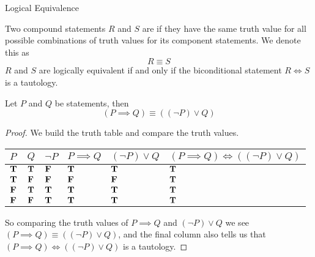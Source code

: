 \vspace*{2em}

\begin{mdframed}
\begin{center}
{\Large Logical Equivalence}
\end{center}
\end{mdframed}

\begin{definition}
Two compound statements $R$ and $S$ are  if they have the same truth value for all possible combinations of truth values for its component statements. We denote this as
\[R \equiv S\]
$R$ and $S$ are logically equivalent if and only if the biconditional statement $R \iff S$ is a tautology.  
\end{definition}

\vspace*{1em}

\begin{theorem}\label{theorem:impliesequiv}
Let $P$ and $Q$ be statements, then
\[(P \implies Q) \equiv ((\neg P) \vee Q)\]
\end{theorem}
\begin{proof}
We build the truth table and compare the truth values.
\begin{center}
{\renewcommand{\arraystretch}{1.5}%
\begin{tabular}{|>{\centering}m{1cm}|>{\centering}m{1cm}|>{\centering}m{1cm}||>{\centering}m{1.5cm}||>{\centering}m{2cm}||>{\centering\arraybackslash}m{4.25cm}|}
\hline
\rowcolor{lightgrey}
$P$ & $Q$ & $\neg P$ & $P \implies Q$ & $(\neg P) \vee Q$ & $(P \implies Q) \iff ((\neg P) \vee Q)$\\
\hline
$\mathbf{T}$ & $\mathbf{T}$ & $\mathbf{F}$ & $\mathbf{T}$ & $\mathbf{T}$ & $\mathbf{T}$\\
\hline
$\mathbf{T}$ & $\mathbf{F}$ & $\mathbf{F}$ & $\mathbf{F}$ & $\mathbf{F}$ & $\mathbf{T}$\\
\hline
$\mathbf{F}$ & $\mathbf{T}$ & $\mathbf{T}$ & $\mathbf{T}$ & $\mathbf{T}$ & $\mathbf{T}$\\
\hline
$\mathbf{F}$ & $\mathbf{F}$ & $\mathbf{T}$ & $\mathbf{T}$ & $\mathbf{T}$ & $\mathbf{T}$\\
\hline
\end{tabular}
}
\end{center}
So comparing the truth values of $P \implies Q$ and $(\neg P) \vee Q$ we see $(P \implies Q) \equiv ((\neg P) \vee Q)$, and the final column also tells us that $(P \implies Q) \iff ((\neg P) \vee Q)$ is a tautology.
\end{proof}

